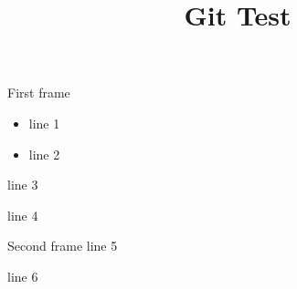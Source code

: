 \documentclass[10pt]{beamer}
\begin{document}
	
	\title{Git Test}
	\frame{\titlepage}
	

\begin{frame}{First frame}

\begin{minipage}{.5\textwidth}
	\begin{itemize}
		\item line 1
		\item line 2
	\end{itemize}
\end{minipage}
\begin{minipage}{.4\textwidth}
	line 3
	\begin{block}{}
		line 4
	\end{block}
\end{minipage}

\end{frame}

\begin{Frame}{Second frame}
	line 5
	\begin{block}{}
		line 6
	\end{block}
\end{Frame}
\end{document}
